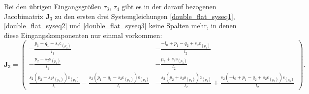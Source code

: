 Bei den übrigen Eingangsgrößen $\tau_3$, $\tau_4$ gibt es in der darauf bezogenen Jacobimatrix $\mathbf{J}_3$ zu den ersten drei Systemgleichungen  \eqref{double_flat_syseq1}, \eqref{double_flat_syseq2} und \eqref{double_flat_syseq3} keine Spalten mehr, in denen diese Eingangskomponenten nur einmal vorkommen:
\begin{equation*}
	\mathbf{J}_3 =
	\left(\begin{smallmatrix}
	- \frac{p_{1} - q_{1} - s_{2} \mathrm{c}_{\left(p_{3} \right)}}{l_{1}} & - \frac{- l_{0} + p_{1} - q_{2} + s_{2} \mathrm{c}_{\left(p_{3} \right)}}{l_{2}}\\
	- \frac{p_{2} - s_{2} \mathrm{s}_{\left(p_{3} \right)}}{l_{1}} & - \frac{p_{2} + s_{2} \mathrm{s}_{\left(p_{3} \right)}}{l_{2}}\\
	\frac{s_{2} \left(p_{2} - s_{2} \mathrm{s}_{\left(p_{3} \right)}\right) \mathrm{c}_{\left(p_{3} \right)}}{l_{1}} - \frac{s_{2} \left(p_{1} - q_{1} - s_{2} \mathrm{c}_{\left(p_{3} \right)}\right) \mathrm{s}_{\left(p_{3} \right)}}{l_{1}} & - \frac{s_{2} \left(p_{2} + s_{2} \mathrm{s}_{\left(p_{3} \right)}\right) \mathrm{c}_{\left(p_{3} \right)}}{l_{2}} + \frac{s_{2} \left(- l_{0} + p_{1} - q_{2} + s_{2} \mathrm{c}_{\left(p_{3} \right)}\right) \mathrm{s}_{\left(p_{3} \right)}}{l_{2}}
	\end{smallmatrix}\right).
\end{equation*}

